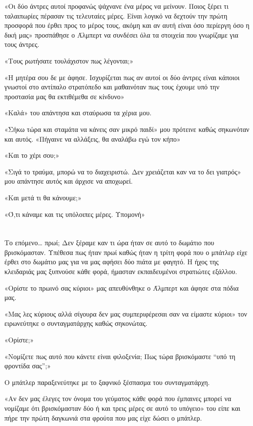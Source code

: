 \documentclass[12pt,twoside, openany]{book}
\begin{document}
«Οι δύο άντρες αυτοί προφανώς ψάχνανε ένα μέρος να μείνουν. Ποιος ξέρει τι ταλαιπωρίες πέρασαν τις τελευταίες μέρες. Είναι λογικό να δεχτούν την πρώτη προσφορά που έρθει προς το μέρος τους, ακόμη και αν αυτή είναι όσο περίεργη όσο η δική μας» προσπάθησε ο Άλμπερτ να συνδέσει όλα τα στοιχεία που γνωρίζαμε για τους άντρες.

«Τους ρωτήσατε τουλάχιστον πως λέγονται;»

«Η μητέρα σου δε με άφησε. Ισχυρίζεται πως αν αυτοί οι δύο άντρες είναι κάποιοι γνωστοί στο αντίπαλο στρατόπεδο και μαθαινόταν πως τους έχουμε υπό την προστασία μας θα εκτιθέμεθα σε κίνδυνο»

«Καλά» του απάντησα και σταύρωσα τα χέρια μου.

«Σήκω τώρα και σταμάτα να κάνεις σαν μικρό παιδί» μου πρότεινε καθώς σηκωνόταν και αυτός. «Πήγαινε να αλλάξεις, θα αναλάβω εγώ τον κήπο»

«Και το χέρι σου;»

«Σιγά το τραύμα, μπορώ να το διαχειριστώ. Δεν χρειάζεται καν να το δει γιατρός» μου απάντησε αυτός και άρχισε να αποχωρεί.

«Και μετά τι θα κάνουμε;»

«Ό,τι κάναμε και τις υπόλοιπες μέρες. Υπομονή»


\chapter{}

Το επόμενο… πρωί; Δεν ξέραμε καν τι ώρα ήταν σε αυτό το δωμάτιο που βρισκόμασταν. Υπέθεσα πως ήταν πρωί καθώς ήταν η τρίτη φορά που ο μπάτλερ είχε έρθει στο δωμάτιο μας για να μας αφήσει δύο πιάτα με φαγητό. Η ήχος της κλειδαριάς μας ξυπνούσε κάθε φορά, ήμασταν εκπαιδευμένοι στρατιώτες εξάλλου.

«Ορίστε το πρωινό σας κύριοι» μας απευθύνθηκε ο Άλμπερτ και άφησε στα πόδια μας. 

«Μας λες κύριους αλλά σίγουρα δεν μας συμπεριφέρεσαι σαν να είμαστε κύριοι» τον ειρωνεύτηκε ο συνταγματάρχης καθώς σηκονώτας.

«Ορίστε;»

«Νομίζετε πως αυτό που κάνετε είναι φιλοξενία; Πως τώρα βρισκόμαστε “υπό τη φροντίδα σας”;»

Ο μπάτλερ παραξενεύτηκε με το ξαφνικό ξέσπασμα του συνταγματάρχη.

«Αν δεν μας έλεγες τον όνομα του γεύματος κάθε φορά που έμπαινες μπορεί να νομίζαμε ότι βρισκόμασταν δύο ή και τρεις μέρες σε αυτό το υπόγειο» του είπε και πήρε την πρώτη δαγκωνιά στα φρούτα που μας είχε δώσει ο μπάτλερ.
\end{document}
